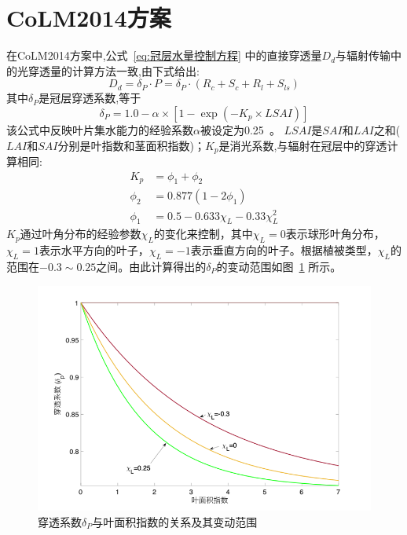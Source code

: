 \section{CoLM2014方案}
在CoLM2014方案中,公式~\eqref{eq:冠层水量控制方程} 中的直接穿透量$D_d$与辐射传输中的光穿透量的计算方法一致,由下式给出:
\begin{equation}
D_{d}=\delta_{P} \cdot P=\delta_{P} \cdot\left(R_{c}+S_{c}+R_{l}+S_{l s}\right)
\end{equation}
其中$\delta_P$是冠层穿透系数,等于
\begin{equation}
\delta_{P}=1.0-\alpha \times\left[1-\exp \left(-K_{p} \times LSAI\right)\right]
\end{equation}
该公式中反映叶片集水能力的经验系数$\alpha$被设定为0.25~\citep{lawrence2011parameterization}。
$LSAI$是$SAI$和$LAI$之和($LAI$和$SAI$分别是叶指数和茎面积指数)；$K_p$是消光系数,与辐射在冠层中的穿透计算相同:
\begin{equation}\label{eq:消光系数}
\begin{aligned}
K_{p} &= \phi_{1}+\phi_{2} \\
\phi_{2} &= 0.877\left(1-2 \phi_{1}\right) \\
\phi_{1} &= 0.5-0.633 \chi_{L}-0.33 \chi_{L}^{2}
\end{aligned}
\end{equation}
$K_p$通过叶角分布的经验参数$\chi_L$的变化来控制，其中$\chi_L=0$表示球形叶角分布，$\chi_L= 1$表示水平方向的叶子，$\chi_L= -1$表示垂直方向的叶子。根据植被类型，$\chi_L$的范围在$-0.3\sim0.25$之间。由此计算得出的$\delta_P$的变动范围如图~\ref{fig:穿透系数与叶面积指数} 所示。
{
\begin{figure}[htbp]
\centering
\includegraphics{Figures/陆地表面的水分循环/穿透系数与叶面积指数.png}
\caption{穿透系数$\delta_P$与叶面积指数的关系及其变动范围}
\label{fig:穿透系数与叶面积指数}
\end{figure}
}


